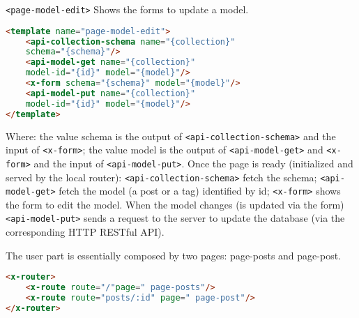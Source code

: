 \begin{itemize} \texttt{<page-model-edit>} Shows the forms to update a model.

\begin{lstlisting}[language=html]
<template name="page-model-edit">
	<api-collection-schema name="{collection}"
	schema="{schema}"/>
	<api-model-get name="{collection}"
	model-id="{id}" model="{model}"/>
	<x-form schema="{schema}" model="{model}"/>
	<api-model-put name="{collection}"
	model-id="{id}" model="{model}"/>
</template>
\end{lstlisting}

Where: the value schema is the output of \texttt{<api-collection-schema>} and the input of \texttt{<x-form>}; the value model is the output of \texttt{<api-model-get>} and \texttt{<x-form>} and the input of \texttt{<api-model-put>}. Once the page is ready (initialized and served by the local router): \texttt{<api-collection-schema>} fetch the schema; \texttt{<api-model-get>} fetch the model (a post or a tag) identified by id; \texttt{<x-form>} shows the form to edit the model. When the model changes (is updated via the form) \texttt{<api-model-put>} sends a request to the server to update the database (via the corresponding HTTP RESTful API).

\end{itemize}

The user part is essentially composed by two pages: page-posts and page-post.

\begin{lstlisting}[language=html]
<x-router>
	<x-route route="/"page=" page-posts"/>
	<x-route route="posts/:id" page=" page-post"/>
</x-router>
\end{lstlisting}

